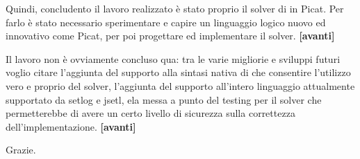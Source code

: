 \documentclass[11pt]{article}
\newcommand*{\nextslide}{\textbf{[avanti]}}
\begin{document}
Quindi, concludento il lavoro realizzato è stato proprio il solver di
\lset{} in Picat. Per farlo è stato necessario sperimentare e capire
un linguaggio logico nuovo ed innovativo come Picat, per poi
progettare ed implementare il solver.  \nextslide{}

Il lavoro non è ovviamente concluso qua: tra le varie migliorie e
sviluppi futuri voglio citare l'aggiunta del supporto alla sintasi
nativa di \lset{} che consentire l'utilizzo vero e proprio del solver,
l'aggiunta del supporto all'intero linguaggio \lset{} attualmente
supportato da setlog e jsetl, ela messa a punto del testing per il
solver che permetterebbe di avere un certo livello di sicurezza sulla
correttezza dell'implementazione. \nextslide{}

Grazie.
\end{document}
